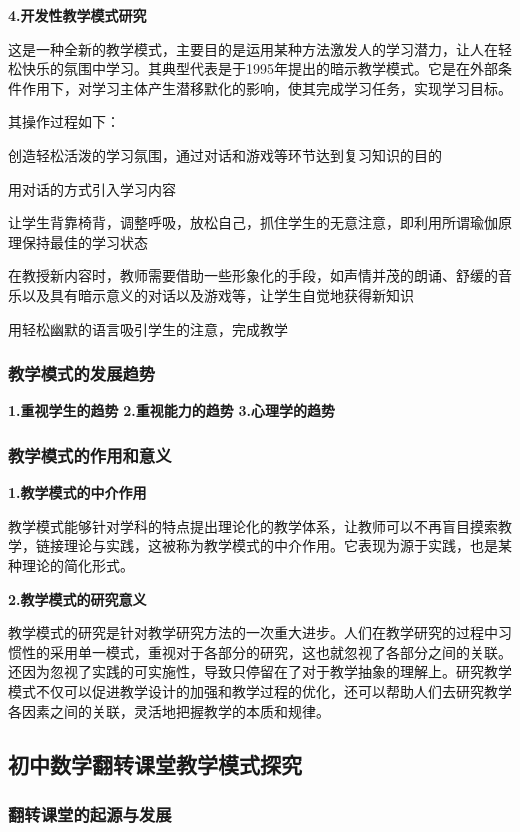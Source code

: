 \documentclass{article}
\begin{document}
\textbf{4.开发性教学模式研究}

这是一种全新的教学模式，主要目的是运用某种方法激发人的学习潜力，让人在轻松快乐的氛围中学习。其典型代表是于1995年提出的暗示教学模式。它是在外部条件作用下，对学习主体产生潜移默化的影响，使其完成学习任务，实现学习目标。

其操作过程如下：

创造轻松活泼的学习氛围，通过对话和游戏等环节达到复习知识的目的

用对话的方式引入学习内容

让学生背靠椅背，调整呼吸，放松自己，抓住学生的无意注意，即利用所谓瑜伽原理保持最佳的学习状态

在教授新内容时，教师需要借助一些形象化的手段，如声情并茂的朗诵、舒缓的音乐以及具有暗示意义的对话以及游戏等，让学生自觉地获得新知识

用轻松幽默的语言吸引学生的注意，完成教学

\subsubsection{教学模式的发展趋势}

\textbf{1.重视学生的趋势}
\textbf{2.重视能力的趋势}
\textbf{3.心理学的趋势}

\subsubsection{教学模式的作用和意义}

\textbf{1.教学模式的中介作用}

教学模式能够针对学科的特点提出理论化的教学体系，让教师可以不再盲目摸索教学，链接理论与实践，这被称为教学模式的中介作用。它表现为源于实践，也是某种理论的简化形式。

\textbf{2.教学模式的研究意义}

教学模式的研究是针对教学研究方法的一次重大进步。人们在教学研究的过程中习惯性的采用单一模式，重视对于各部分的研究，这也就忽视了各部分之间的关联。还因为忽视了实践的可实施性，导致只停留在了对于教学抽象的理解上。研究教学模式不仅可以促进教学设计的加强和教学过程的优化，还可以帮助人们去研究教学各因素之间的关联，灵活地把握教学的本质和规律。


\subsection{初中数学翻转课堂教学模式探究}

\subsubsection{翻转课堂的起源与发展}
\end{document}
